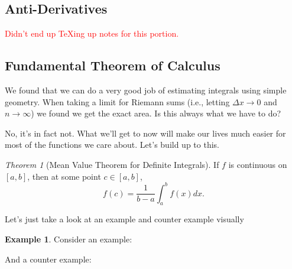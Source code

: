 \documentclass[leqno]{article}
\theoremstyle{definition}
\newtheorem{example}{Example}[section]
\theoremstyle{remark}
\theoremstyle{theorem}
\newtheorem{theorem}{Theorem}[section]
\begin{document}
\subsection{Anti-Derivatives}

\textcolor{red}{Didn't end up TeXing up notes for this portion.}

\subsection{Fundamental Theorem of Calculus}

We found that we can do a very good job of estimating integrals using simple geometry.  When taking a limit for Riemann sums (i.e., letting $\Delta x \to 0$ and $n\to \infty$) we found we get the exact area.  Is this always what we have to do?

No, it's in fact not.  What we'll get to now will make our lives much easier for most of the functions we care about.  Let's build up to this.

\begin{theorem}[Mean Value Theorem for Definite Integrals]
If $f$ is continuous on $[a,b]$, then at some point $c\in [a,b]$,
\[
f(c)=\frac{1}{b-a}\int_a^b f(x)dx.
\]
\end{theorem}
Let's just take a look at an example and counter example visually

\begin{example}
Consider an example:
\vspace*{4cm}

And a counter example:
\vspace*{4cm}
\end{example}
\end{document}

